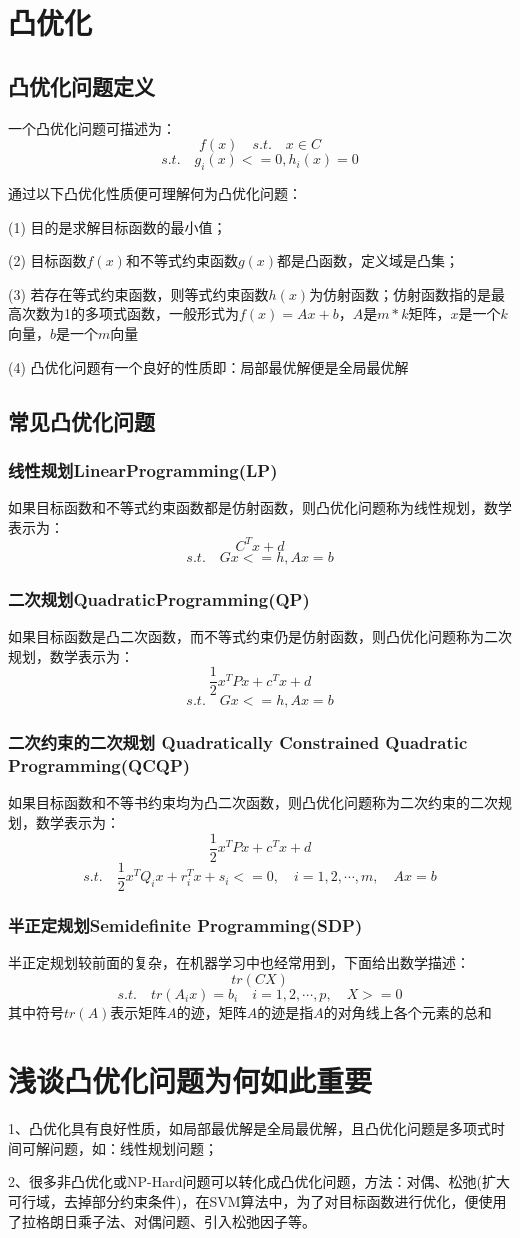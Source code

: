 \documentclass[12pt]{article}
\begin{document}
\section{凸优化}
\subsection{凸优化问题定义}
一个凸优化问题可描述为：
$$
f(x) \quad s.t. \quad x\in C
$$
$$
s.t. \quad g_i(x) <= 0, h_i(x) = 0
$$

通过以下凸优化性质便可理解何为凸优化问题：

(1) 目的是求解目标函数的最小值；

(2) 目标函数$f(x)$和不等式约束函数$g(x)$都是凸函数，定义域是凸集；

(3) 若存在等式约束函数，则等式约束函数$h(x)$为仿射函数；仿射函数指的是最高次数为1的多项式函数，一般形式为$f(x)= Ax + b$，$A$是$m*k$矩阵，$x$是一个$k$向量，$b$是一个$m$向量

(4) 凸优化问题有一个良好的性质即：局部最优解便是全局最优解

\subsection{常见凸优化问题}
\subsubsection{线性规划LinearProgramming(LP)}
如果目标函数和不等式约束函数都是仿射函数，则凸优化问题称为线性规划，数学表示为：
$$
C^Tx + d
$$
$$
s.t.\quad Gx <= h, Ax = b
$$

\subsubsection{二次规划QuadraticProgramming(QP)}
如果目标函数是凸二次函数，而不等式约束仍是仿射函数，则凸优化问题称为二次规划，数学表示为：
$$
\frac{1}{2}x^TPx + c^Tx + d
$$
$$
s.t.\quad Gx <= h, Ax = b
$$

\subsubsection{ 二次约束的二次规划 Quadratically Constrained Quadratic Programming(QCQP)}
如果目标函数和不等书约束均为凸二次函数，则凸优化问题称为二次约束的二次规划，数学表示为：
$$
\frac{1}{2}x^TPx + c^Tx + d
$$
$$
s.t.\quad \frac{1}{2}x^TQ_ix + r_i^Tx + s_i <= 0, \quad i = 1, 2, \cdots, m, \quad Ax = b
$$

\subsubsection{半正定规划Semidefinite Programming(SDP)}
半正定规划较前面的复杂，在机器学习中也经常用到，下面给出数学描述：
$$
tr(CX)
$$
$$
s.t. \quad tr(A_ix) = b_i \quad i = 1, 2, \cdots, p, \quad X >= 0
$$
其中符号$tr(A)$表示矩阵$A$的迹，矩阵$A$的迹是指$A$的对角线上各个元素的总和

\section{浅谈凸优化问题为何如此重要}
1、凸优化具有良好性质，如局部最优解是全局最优解，且凸优化问题是多项式时间可解问题，如：线性规划问题；

2、很多非凸优化或NP-Hard问题可以转化成凸优化问题，方法：对偶、松弛(扩大可行域，去掉部分约束条件)，在SVM算法中，为了对目标函数进行优化，便使用了拉格朗日乘子法、对偶问题、引入松弛因子等。



\end{document}
